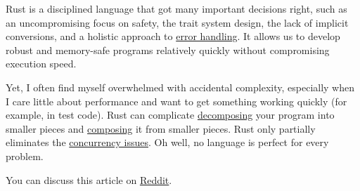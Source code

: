 \documentclass{article}
\begin{document}
Rust is a disciplined language that got many important decisions right, such as an uncompromising focus on safety, the trait system design, the lack of implicit conversions, and a holistic approach to \href{/posts/12-rust-error-handling.html}{error handling}.
It allows us to develop robust and memory-safe programs relatively quickly without compromising execution speed.

Yet, I often find myself overwhelmed with accidental complexity, especially when I care little about performance and want to get something working quickly (for example, in test code).
Rust can complicate \href{#abstraction-hurts}{decomposing} your program into smaller pieces and \href{#composition-hurts}{composing} it from smaller pieces.
Rust only partially eliminates the \href{#fearless-concurrency}{concurrency issues}.
Oh well, no language is perfect for every problem.

You can discuss this article on \href{https://www.reddit.com/r/rust/comments/112hmga/blog_post_when_rust_hurts/}{Reddit}.
\end{document}
